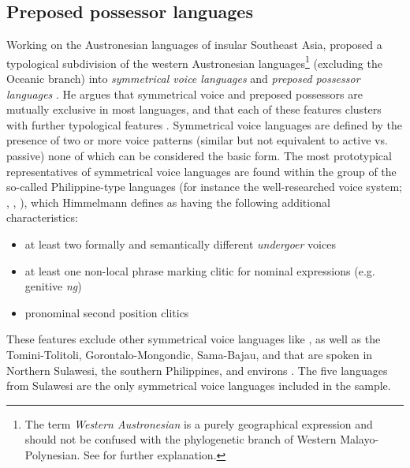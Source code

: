 \subsection{Preposed possessor languages}\label{sec:preposed}

Working on the Austronesian languages of insular Southeast Asia, \citeauthor{Himmelmann2005austronesian} proposed a typological subdivision of the western Austronesian languages\footnote{The 
    term \textit{Western Austronesian} is a purely geographical expression and should not be confused with the phylogenetic branch of Western Malayo-Polynesian. See \citet{Himmelmann2005austronesian} 
    for further explanation.
}
(excluding the Oceanic branch) into \emph{symmetrical voice languages} and \emph{preposed possessor languages} \citep{Himmelmann2005austronesian}. He argues that symmetrical voice and preposed possessors are mutually exclusive in most languages, and that each of these features clusters with further typological features \citep[113]{Himmelmann2005austronesian}. Symmetrical voice languages are defined by the presence of two or more voice patterns (similar but not equivalent to active vs. passive) none of which can be considered the basic form. The most prototypical representatives of symmetrical voice languages are found within the group of the so-called Philippine-type languages (for instance the well-researched  voice system; \citealt{schachter1976subject}, \citealt{Himmelmann2005tagalog}, \citealt{riesberg2014symmetrical}), which Himmelmann defines as having the following additional characteristics:

\begin{itemize}
\item at least two formally and semantically different \textit{undergoer} voices
\item at least one non-local phrase marking clitic for nominal expressions (e.g.  genitive \textit{ng})
\item pronominal second position clitics
\end{itemize}

These features exclude other symmetrical voice languages like ,  as well as the Tomini-Tolitoli, Gorontalo-Mongondic, Sama-Bajau, and  that are spoken in Northern Sulawesi, the southern Philippines, and environs \citep[113]{Himmelmann2005austronesian}. The five languages from Sulawesi are the only symmetrical voice languages included in the sample.

